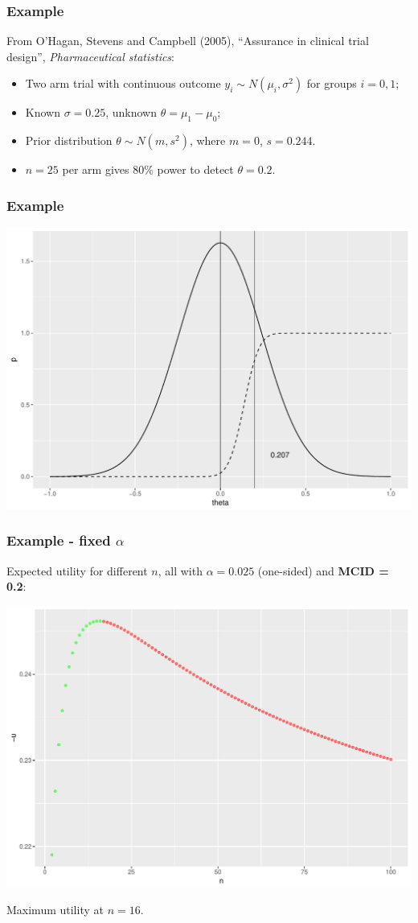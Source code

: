 \documentclass{beamer}
\begin{document}
\begin{frame}
\frametitle{Example}
From O'Hagan, Stevens and Campbell (2005), ``Assurance in clinical trial design'', \emph{Pharmaceutical statistics}:

\begin{itemize}
\item Two arm trial with continuous outcome $y_{i} \sim N(\mu_{i}, \sigma^{2})$ for groups $i = 0,1$;
\item Known $\sigma = 0.25$, unknown $\theta = \mu_{1} - \mu_{0}$;
\item Prior distribution $\theta \sim N(m, s^{2})$, where $m = 0$, $s = 0.244$.
\item $n = 25$ per arm gives 80\% power to detect $\theta = 0.2$.
\end{itemize}
\end{frame}

\begin{frame}
\frametitle{Example}
\centering
\includegraphics[scale=0.5]{prior_eff}
\end{frame}

\begin{frame}
\frametitle{Example - fixed $\alpha$}
Expected utility for different $n$, all with $\alpha = 0.025$ (one-sided) and \textbf{MCID = 0.2}:

\centering
\includegraphics[scale=0.4]{fix_a_2}

Maximum utility at $n = 16$.
\end{frame}
\end{document}

